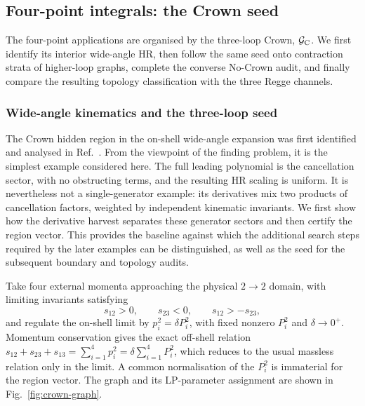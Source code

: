 \documentclass[a4paper,11pt]{article}
\begin{document}
\subsection{Four-point integrals: the Crown seed}
\label{sec:example-crown}

The four-point applications are organised by the three-loop Crown,
\(\mathcal G_{\rm C}\).  We first identify its interior wide-angle HR, then
follow the same seed onto
contraction strata of higher-loop graphs, complete the converse No-Crown
audit, and finally compare the resulting topology classification with the
three Regge channels.

\subsubsection{Wide-angle kinematics and the three-loop seed}

The Crown hidden region in the on-shell wide-angle expansion was first
identified and analysed in Ref.~\cite{Gardi:2024axt}.  From the viewpoint of
the finding problem, it is the simplest example considered here.  The full
leading polynomial is the cancellation sector, with no obstructing terms, and
the resulting HR scaling is uniform.  It is nevertheless not a
single-generator example: its derivatives mix two products of cancellation
factors, weighted by independent kinematic invariants.  We first show how the
derivative harvest separates these generator sectors and then certify the
region vector.  This provides the baseline against which the additional
search steps required by the later examples can be distinguished, as well as
the seed for the subsequent boundary and topology audits.

Take four external momenta approaching the physical \(2\to2\) domain, with
limiting invariants satisfying
\begin{equation}
 s_{12}>0,\qquad s_{23}<0,\qquad s_{12}>-s_{23},
 \label{eq:crown-domain}
\end{equation}
and regulate the on-shell limit by \(p_i^2=\delta P_i^2\), with fixed
nonzero \(P_i^2\) and \(\delta\to0^+\).  Momentum conservation gives the
exact off-shell relation
\(s_{12}+s_{23}+s_{13}=\sum_{i=1}^4p_i^2
=\delta\sum_{i=1}^4P_i^2\), which reduces to the usual massless relation
only in the limit.  A common normalisation of the \(P_i^2\) is immaterial
for the region vector.  The graph and its
LP-parameter assignment are shown in Fig.~\ref{fig:crown-graph}.
\end{document}
